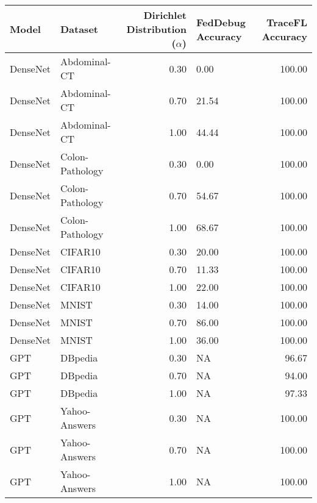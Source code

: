\begin{tabular}{llrlr}
\toprule
Model & Dataset & Dirichlet Distribution ($\alpha$) & FedDebug Accuracy & TraceFL Accuracy \\
\midrule
DenseNet & Abdominal-CT & 0.30 & 0.00 & 100.00 \\
DenseNet & Abdominal-CT & 0.70 & 21.54 & 100.00 \\
DenseNet & Abdominal-CT & 1.00 & 44.44 & 100.00 \\
DenseNet & Colon-Pathology & 0.30 & 0.00 & 100.00 \\
DenseNet & Colon-Pathology & 0.70 & 54.67 & 100.00 \\
DenseNet & Colon-Pathology & 1.00 & 68.67 & 100.00 \\
DenseNet & CIFAR10 & 0.30 & 20.00 & 100.00 \\
DenseNet & CIFAR10 & 0.70 & 11.33 & 100.00 \\
DenseNet & CIFAR10 & 1.00 & 22.00 & 100.00 \\
DenseNet & MNIST & 0.30 & 14.00 & 100.00 \\
DenseNet & MNIST & 0.70 & 86.00 & 100.00 \\
DenseNet & MNIST & 1.00 & 36.00 & 100.00 \\
GPT & DBpedia & 0.30 & NA & 96.67 \\
GPT & DBpedia & 0.70 & NA & 94.00 \\
GPT & DBpedia & 1.00 & NA & 97.33 \\
GPT & Yahoo-Answers & 0.30 & NA & 100.00 \\
GPT & Yahoo-Answers & 0.70 & NA & 100.00 \\
GPT & Yahoo-Answers & 1.00 & NA & 100.00 \\
\bottomrule
\end{tabular}
